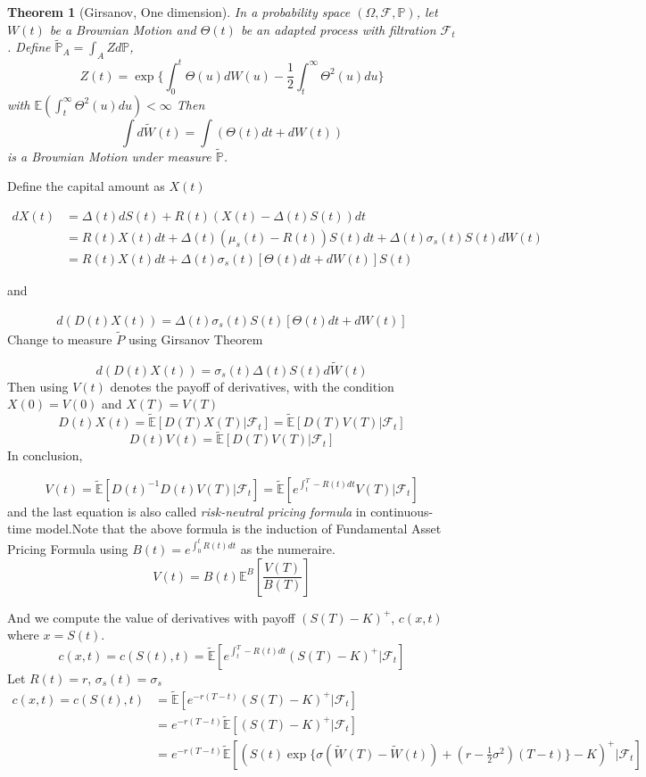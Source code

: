 \documentclass[a4]{article}
\newtheorem{theorem}{Theorem}
\begin{document}
\begin{theorem}[Girsanov, One dimension]
	In a probability space $(\Omega, \mathcal{F}, \mathbb{P})$, let $W(t)$ be a Brownian Motion and $\Theta(t)$ be an adapted process with filtration $\mathcal{F}_{t}$. Define $\tilde{\mathbb{P}}_{A}=\int_{A}Zd\mathbb{P}$, $$
	Z(t) = \exp\{\int^{t}_{0}\Theta(u)dW(u)-\frac{1}{2}\int_{t}^{\infty}\Theta^{2}(u)du\}
	$$
	with $\mathbb{E}(\int_{t}^{\infty}\Theta^{2}(u)du)<\infty$ Then $$
	\int d\tilde{W}(t) = \int (\Theta(t)dt + dW(t))
	$$is a Brownian Motion under measure $\tilde{\mathbb{P}}$.
\end{theorem}
Define the capital amount as $X(t)$\par 
$$
\begin{aligned}
dX(t) &= \Delta(t)dS(t) + R(t)(X(t) - \Delta(t)S(t))dt\\
&=R(t)X(t)dt+\Delta(t)(\mu_{s}(t)-R(t))S(t)dt +\Delta(t)\sigma_{s}(t)S(t)dW(t)\\
&=R(t)X(t)dt+\Delta(t)\sigma_{s}(t)[\Theta(t)dt +dW(t)]S(t)
\end{aligned}
$$\par 
and\par 
$$
\begin{aligned}
d(D(t)X(t)) =\Delta(t)\sigma_{s}(t)S(t)[\Theta(t)dt +dW(t)]
\end{aligned}
$$
Change to measure $\tilde{P}$ using Girsanov Theorem\par 
$$
d(D(t)X(t)) =\sigma_{s}(t)\Delta(t)S(t)d\tilde{W}(t)
$$
Then using $V(t)$ denotes the payoff of derivatives, with the condition $X(0) = V(0)$ and $X(T) = V(T)$
$$
D(t)X(t) = \tilde{\mathbb{E}}[D(T)X(T)|\mathcal{F}_{t}]=\tilde{\mathbb{E}}[D(T)V(T)|\mathcal{F}_{t}]
$$
$$
D(t)V(t) =\tilde{\mathbb{E}}[D(T)V(T)|\mathcal{F}_{t}]
$$
In conclusion, \par 
$$
V(t) =\tilde{\mathbb{E}}[D(t)^{-1}D(t)V(T)|\mathcal{F}_{t}]=\tilde{\mathbb{E}}[e^{\int_{t}^{T}-R(t)dt}V(T)|\mathcal{F}_{t}]
$$
and the last equation is also called \textsl{risk-neutral pricing formula} in continuous-time model.Note that the above formula is the induction of Fundamental Asset Pricing Formula using $B(t) = e^{\int^{t}_{0}R(t)dt}$ as the numeraire.
$$
V(t) = B(t)\mathbb{E}^{B}\left[\frac{V(T)}{B(T)}\right]
$$
\par And we compute the value of derivatives with payoff $(S(T)-K)^{+}$, $c(x,t)$ where $x=S(t)$.
$$
c(x,t) = c(S(t),t) = \tilde{\mathbb{E}}[e^{\int_{t}^{T}-R(t)dt}(S(T)-K)^{+}|\mathcal{F}_{t}]
$$
Let $R(t)=r$, $\sigma_{s}(t)=\sigma_{s}$
$$
\begin{aligned}
c(x,t) = c(S(t),t) &= \tilde{\mathbb{E}}[e^{-r(T-t)}(S(T)-K)^{+}|\mathcal{F}_{t}]\\&= e^{-r(T-t)}\tilde{\mathbb{E}}[(S(T)-K)^{+}|\mathcal{F}_{t}]\\ 
&= e^{-r(T-t)}\tilde{\mathbb{E}}[(S(t)\exp\{\sigma (\tilde{W}(T)-\tilde{W}(t)) + (r-\frac{1}{2}\sigma^{2})(T-t)\}-K)^{+}|\mathcal{F}_{t}]\\ 
\end{aligned}
$$
\end{document}
